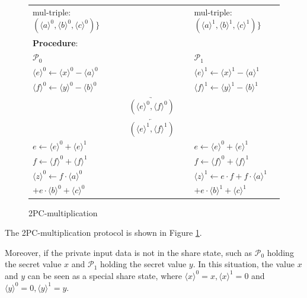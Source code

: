 \documentclass[letterpaper]{article} %
\begin{document}
\begin{figure}[ht]
{\begin{tabular}{lcl}
            mul-triple:$
            (\langle a\rangle ^{0},\langle b\rangle ^{0},\langle c\rangle ^{0})\}$
            &
            &
            mul-triple:$ (\langle a\rangle ^{1},\langle b\rangle ^{1},\langle c\rangle ^{1})\}$
            \\
            \textbf{Procedure}:\\
            $\mathcal{P}_{0}$ &  &  $\mathcal{P}_{1}$ \\
            $\langle e\rangle ^{0}\leftarrow\langle x\rangle ^{0}-\langle a\rangle ^{0}$
            &
            &
            $\langle e\rangle ^{1}\leftarrow\langle x\rangle ^{1}-\langle a\rangle ^{1}$
            \\
            $\langle f\rangle ^{0}\leftarrow\langle y\rangle ^{0}-\langle b\rangle ^{0}$
            &
            &
            $\langle f\rangle ^{1}\leftarrow\langle y\rangle ^{1}-\langle b\rangle ^{1}$
            \\
            & $\underrightarrow{~~~~~~(\langle e\rangle ^{0},\langle f\rangle ^{0})~~~~~~}$ &\\
            & $\underleftarrow{~~~~~~(\langle e\rangle ^{1},\langle f\rangle ^{1})~~~~~~}$ &\\
            $e\leftarrow\langle e\rangle ^{0}+\langle e\rangle ^{1}$& &$e\leftarrow\langle e\rangle ^{0}+\langle e\rangle ^{1}$\\
            $f\leftarrow\langle f\rangle ^{0}+\langle f\rangle ^{1}$& &$f\leftarrow\langle f\rangle ^{0}+\langle f\rangle ^{1}$\\
            $\langle z\rangle^{0}\leftarrow f\cdot \langle a\rangle^{0}$
            & &
            $\langle z\rangle^{1}\leftarrow e \cdot f + f\cdot \langle a\rangle^{1}$\\
            $+e \cdot \langle b\rangle^{0} + \langle c\rangle^{0}$&
            &$+e \cdot \langle b\rangle^{1} + \langle c\rangle^{1}$\\
            \hline

        \end{tabular}}
        \caption{2PC-multiplication}
        \label{2PC-multiplication}

    \end{figure}
    The 2PC-multiplication protocol is shown in Figure \ref{2PC-multiplication}.

    Moreover, if the private input data is not in the share state,
    such as $\mathcal{P}_{0}$ holding the secret value $x$
    and $\mathcal{P}_{1}$ holding the secret value $y$.
    In this situation, the value $x$ and $y$ can be
    seen as a special share state, where
    $\langle x\rangle ^{0}=x,\langle x\rangle ^{1}=0$ and
    $\langle y\rangle ^{0}=0,\langle y\rangle ^{1}=y$.
\end{document}
